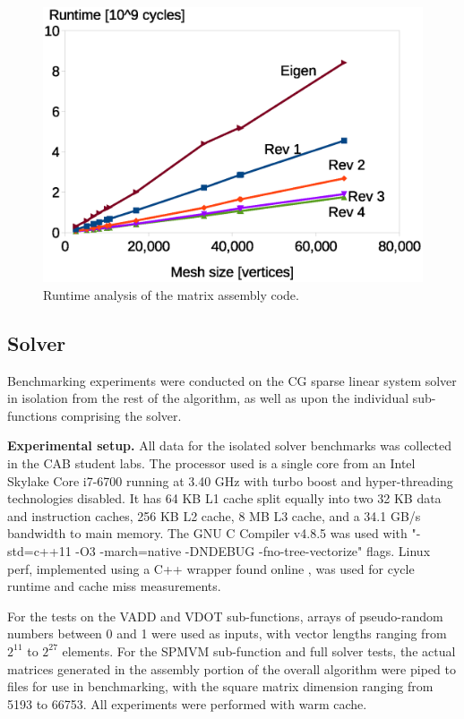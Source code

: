 \documentclass[letterpaper]{article}
\newcommand{\mypar}[1]{{\bf #1.}}
\begin{document}
\begin{figure}\centering
  \includegraphics[width=\linewidth]{./plots/assembly_runtime.eps}
  \caption{Runtime analysis of the matrix assembly code.}
  \label{fig:runtime_assemby}
\end{figure}

\subsection{Solver}
Benchmarking experiments were conducted on the CG sparse linear system solver in isolation from the rest of the algorithm, as well as upon the individual sub-functions comprising the solver.

\mypar{Experimental setup} All data for the isolated solver benchmarks was collected in the CAB student labs. The processor used is a single core from an Intel Skylake Core i7-6700 running at 3.40 GHz with turbo boost and hyper-threading technologies disabled. It has 64 KB L1 cache split equally into two 32 KB data and instruction caches, 256 KB L2 cache, 8 MB L3 cache, and a 34.1 GB/s bandwidth to main memory. The GNU C Compiler v4.8.5 was used with "-std=c++11 -O3 -march=native -DNDEBUG -fno-tree-vectorize" flags. Linux perf, implemented using a C++ wrapper found online \cite{perfWrapper}, was used for cycle runtime and cache miss measurements.

For the tests on the VADD and VDOT sub-functions, arrays of pseudo-random numbers between 0 and 1 were used as inputs, with vector lengths ranging from $2^{11}$ to $2^{27}$ elements. For the SPMVM sub-function and full solver tests, the actual matrices generated in the assembly portion of the overall algorithm were piped to files for use in benchmarking, with the square matrix dimension ranging from 5193 to 66753. All experiments were performed with warm cache.
\end{document}
